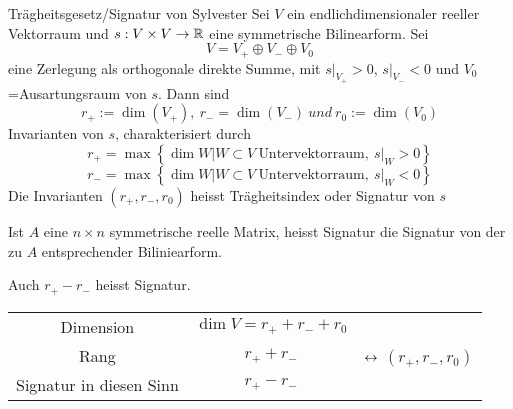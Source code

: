 \begin{Prop}{Trägheitsgesetz/Signatur von Sylvester}
  Sei $V$ ein endlichdimensionaler reeller Vektorraum und $s:V\times V\to\mathbb{R}$ eine symmetrische Bilinearform. Sei
  \[V=V_+\oplus V_-\oplus V_0\]
  eine Zerlegung als orthogonale direkte Summe, mit $s|_{V_+}>0$, $s|_{V_-}<0$ und $V_0$=Ausartungsraum von $s$. Dann sind
  \[r_+:=\dim(V_+),\ r_-=\dim(V_-)\ und\ r_0:=\dim(V_0)\]
  Invarianten von $s$, charakterisiert durch
  \[r_+=\max\left\{ \dim W| W\subset V\ \text{Untervektorraum},\ s|_W>0 \right\}\]
  \[r_-=\max\left\{ \dim W| W\subset V\ \text{Untervektorraum},\ s|_W<0 \right\}\]
  Die Invarianten $(r_+,r_-,r_0)$ heisst Trägheitsindex oder Signatur von $s$
\end{Prop}
\begin{Bem}
  Ist $A$ eine $n\times n$ symmetrische reelle Matrix, heisst Signatur die Signatur von der zu $A$ entsprechender Biliniearform.
\end{Bem}
\begin{Bem}
  Auch $r_+-r_-$ heisst Signatur.
  \begin{table*}[htb]
    \centering
    \begin{tabular}{ccc}
      Dimension & $\dim V=r_++r_-+r_0$\\
      Rang & $r_++r_-$ & $\leftrightarrow$ $(r_+,r_-,r_0)$\\
      Signatur in diesen Sinn & $r_+-r_-$
    \end{tabular}
  \end{table*}
\end{Bem}
